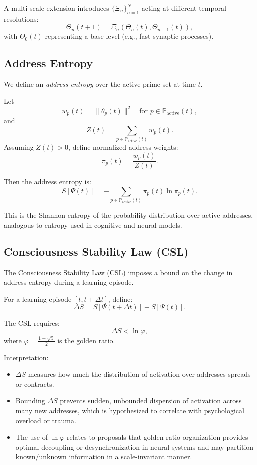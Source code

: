 \documentclass[11pt]{article}
\begin{document}
A multi-scale extension introduces $\{\Xi_n\}_{n=1}^N$ acting at different temporal resolutions:
\[
\Theta_n(t+1) = \Xi_n(\Theta_n(t), \Theta_{n-1}(t)),
\]
with $\Theta_0(t)$ representing a base level (e.g., fast synaptic processes).

\subsection{Address Entropy}

We define an \emph{address entropy} over the active prime set at time $t$.

Let
\[
w_p(t) = \|\theta_p(t)\|^2 \quad\text{for }p \in \mathbb{P}_{\mathrm{active}}(t),
\]
and
\[
Z(t) = \sum_{p \in \mathbb{P}_{\mathrm{active}}(t)} w_p(t).
\]
Assuming $Z(t) > 0$, define normalized address weights:
\[
\pi_p(t) = \frac{w_p(t)}{Z(t)}.
\]

Then the address entropy is:
\begin{equation}
S[\Psi(t)] = -\sum_{p \in \mathbb{P}_{\mathrm{active}}(t)} \pi_p(t) \ln \pi_p(t).
\end{equation}

This is the Shannon entropy of the probability distribution over active addresses, analogous to entropy used in cognitive and neural models. \cite{EntropyCognitiveModels,EntropyNeuralControl}

\subsection{Consciousness Stability Law (CSL)}

The Consciousness Stability Law (CSL) imposes a bound on the change in address entropy during a learning episode.

For a learning episode $[t, t+\Delta t]$, define:
\[
\Delta S = S[\Psi(t+\Delta t)] - S[\Psi(t)].
\]

The CSL requires:
\begin{equation}
\Delta S < \ln \varphi,
\end{equation}
where $\varphi = \frac{1 + \sqrt{5}}{2}$ is the golden ratio. \cite{neuroplasticityMT}

Interpretation:

\begin{itemize}[noitemsep]
  \item $\Delta S$ measures how much the distribution of activation over addresses spreads or contracts.
  \item Bounding $\Delta S$ prevents sudden, unbounded dispersion of activation across many new addresses, which is hypothesized to correlate with psychological overload or trauma.
  \item The use of $\ln \varphi$ relates to proposals that golden-ratio organization provides optimal decoupling or desynchronization in neural systems and may partition known/unknown information in a scale-invariant manner. \cite{GoldenEEG,GoldenRatioInfo}
\end{itemize}
\end{document}
